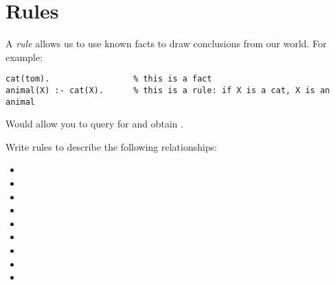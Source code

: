 \documentclass{../../../tp}
\begin{document}
\section{Rules}

A \emph{rule} allows us to use known facts to draw conclusions from our world. For example:

\begin{verbatim}
cat(tom).                 % this is a fact
animal(X) :- cat(X).      % this is a rule: if X is a cat, X is an animal
\end{verbatim}

Would allow you to query for  and obtain .


\begin{instruction}
	Write rules to describe the following relationships:
	\begin{itemize}
	 \item {}
	 \item {}
	 \item {}
	 \item {}
	 \item {}
	 \item {}
	 \item {}
	 \item {}
	 \item {}
	\end{itemize}
\end{instruction}
\end{document}
